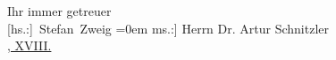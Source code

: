 \pstart
           Ihr immer getreuer{\\[\baselineskip]}\spacefill\mbox{{[}hs.:{]} Stefan Zweig}\pend
           \leftskip=0em{}
\pstart
           \noindent{}{[}ms.:{]} Herrn Dr. Artur Schnitzler{\\}\uline{, XVIII.}\pend
           \endnumbering{}  \newcommand{\dateiname}{L03693}\newcommand{\titel}{Stefan Zweig an Arthur Schnitzler, 2. 4. 1930}\newcommand{\editorInnen}{Selma Jahnke und Martin Anton Müller}
